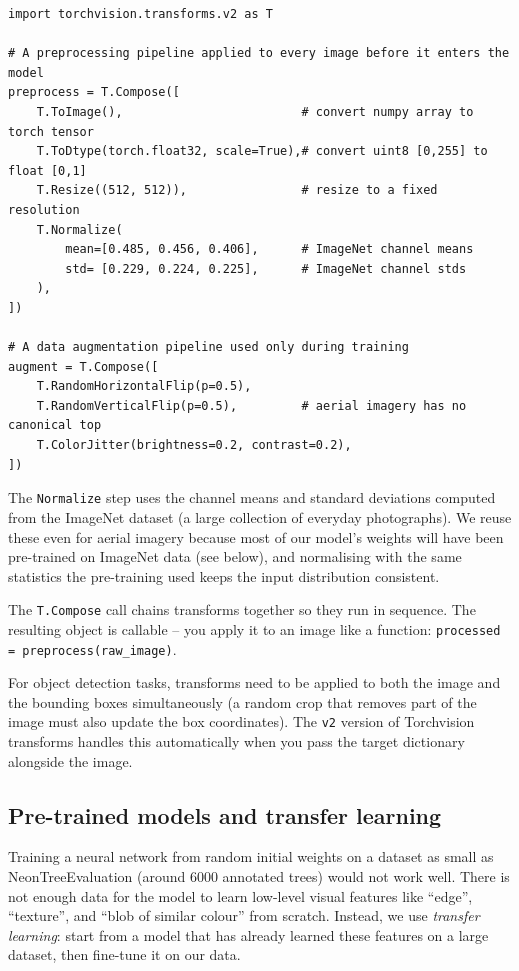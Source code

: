 \documentclass[11pt, a4paper]{article}
\newenvironment{intuition}{%
  \begin{tcolorbox}[
    colback=warnbg, colframe=warnframe,
    fonttitle=\bfseries, title=Intuition,
    breakable, enhanced
  ]
}{%
  \end{tcolorbox}
}
\begin{document}
\begin{lstlisting}
import torchvision.transforms.v2 as T

# A preprocessing pipeline applied to every image before it enters the model
preprocess = T.Compose([
    T.ToImage(),                         # convert numpy array to torch tensor
    T.ToDtype(torch.float32, scale=True),# convert uint8 [0,255] to float [0,1]
    T.Resize((512, 512)),                # resize to a fixed resolution
    T.Normalize(
        mean=[0.485, 0.456, 0.406],      # ImageNet channel means
        std= [0.229, 0.224, 0.225],      # ImageNet channel stds
    ),
])

# A data augmentation pipeline used only during training
augment = T.Compose([
    T.RandomHorizontalFlip(p=0.5),
    T.RandomVerticalFlip(p=0.5),         # aerial imagery has no canonical top
    T.ColorJitter(brightness=0.2, contrast=0.2),
])
\end{lstlisting}

\begin{intuition}
  The \lstinline{Normalize} step uses the channel means and standard
  deviations computed from the ImageNet dataset (a large collection of
  everyday photographs). We reuse these even for aerial imagery because most
  of our model's weights will have been pre-trained on ImageNet data (see
  below), and normalising with the same statistics the pre-training used keeps
  the input distribution consistent.
\end{intuition}

The \lstinline{T.Compose} call chains transforms together so they run in
sequence. The resulting object is callable -- you apply it to an image like a
function: \lstinline{processed = preprocess(raw_image)}.

For object detection tasks, transforms need to be applied to both the image
and the bounding boxes simultaneously (a random crop that removes part of the
image must also update the box coordinates). The \lstinline{v2} version of
Torchvision transforms handles this automatically when you pass the target
dictionary alongside the image.

\subsection{Pre-trained models and transfer learning}

Training a neural network from random initial weights on a dataset as small as
NeonTreeEvaluation (around 6000 annotated trees) would not work well. There is
not enough data for the model to learn low-level visual features like
``edge'', ``texture'', and ``blob of similar colour'' from scratch. Instead,
we use \emph{transfer learning}: start from a model that has already learned
these features on a large dataset, then fine-tune it on our data.
\end{document}
